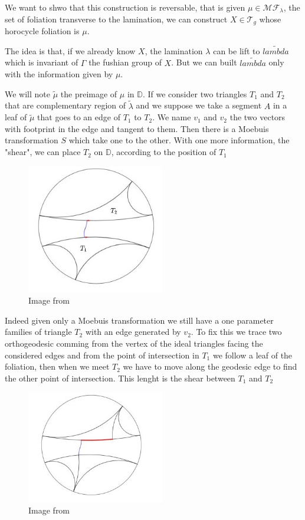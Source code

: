 We want to shwo that this construction is reversable, that is given $\mu \in \mathcal{MF}_\lambda $, the set of foliation transverse to the lamination, we can
construct $X \in \mathcal{T}_g$ whose horocycle foliation is $\mu$.

The idea is that, if we already know $X$, the lamination $\lambda$ can be lift to $\tilde{lambda}$ which is invariant of $\Gamma$ the fushian group of $X$. But we can built $\tilde{lambda}$ only with the information given by $\mu$.

We will note $\tilde{\mu}$ the preimage of $\mu$ in $\mathbb{D}$. If we consider two triangles $T_1$ and $T_2$  that are complementary region of $\tilde{\lambda}$ and we suppose we take a segment $A$ in a leaf of $\tilde{\mu}$ that goes to an edge of $T_1$ to $T_2$. We name $v_1$ and $v_2$ the two vectors with footprint in the edge and tangent to them. Then there is a Moebuis transformation $S$ which take one to the other. With one more information, the "shear", we can place $T_2$ on $\mathbb{D}$, according to the position of $T_1$

\begin{figure}[h!]
\centering
\includegraphics[width=6cm]{Image/Foliation.jpg}
\caption{Image from \cite{wright2018mirzakhani}}
\end{figure}

Indeed given only a Moebuis transformation we still have a one parameter families of triangle $T_2$ with an edge generated by $v_2$. To fix this we trace two orthogeodesic comming from the vertex of the ideal triangles facing the considered edges and from the point of intersection in $T_1$ we follow a leaf of the foliation, then when we meet $T_2$ we have to move along the geodesic edge to find the other point of intersection. This lenght is the shear between $T_1$ and $T_2$

\begin{figure}[h!]
\centering
\includegraphics[width=6cm]{Image/Shear.jpg}
\caption{Image from \cite{wright2018mirzakhani}}
\end{figure}

